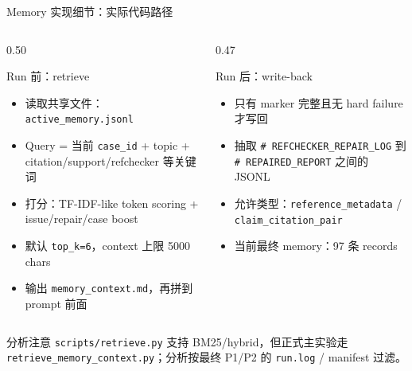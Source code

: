 \documentclass[UTF8,fontset=fandol,aspectratio=169]{ctexbeamer}
\begin{document}
\begin{frame}{Memory 实现细节：实际代码路径}
  \small
  \begin{columns}[T,onlytextwidth]
    \begin{column}{0.50\textwidth}
      \begin{block}{Run 前：retrieve}
        \begin{itemize}
          \setlength{\itemsep}{1pt}
          \item 读取共享文件：\texttt{active\_memory.jsonl}
          \item Query = 当前 \texttt{case\_id} + topic + citation/support/refchecker 等关键词
          \item 打分：TF-IDF-like token scoring + issue/repair/case boost
          \item 默认 \texttt{top\_k=6}，context 上限 5000 chars
          \item 输出 \texttt{memory\_context.md}，再拼到 prompt 前面
        \end{itemize}
      \end{block}
    \end{column}

    \begin{column}{0.47\textwidth}
      \begin{block}{Run 后：write-back}
        \begin{itemize}
          \setlength{\itemsep}{2pt}
          \item 只有 marker 完整且无 hard failure 才写回
          \item 抽取 \texttt{\# REFCHECKER\_REPAIR\_LOG} 到 \texttt{\# REPAIRED\_REPORT} 之间的 JSONL
          \item 允许类型：\texttt{reference\_metadata} / \texttt{claim\_citation\_pair}
          \item 当前最终 memory：97 条 records
        \end{itemize}
      \end{block}
    \end{column}
  \end{columns}

  \vspace{0.4em}
  \begin{alertblock}{分析注意}
    \texttt{scripts/retrieve.py} 支持 BM25/hybrid，但正式主实验走 \texttt{retrieve\_memory\_context.py}；分析按最终 P1/P2 的 \texttt{run.log} / manifest 过滤。
  \end{alertblock}
\end{frame}
\end{document}
